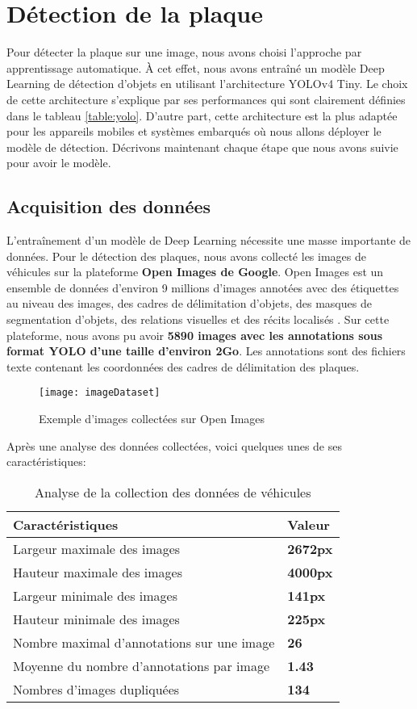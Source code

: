 \section{Détection de la plaque}
Pour détecter la plaque sur une image, nous avons choisi l’approche par apprentissage automatique. À cet effet, nous avons entraîné un modèle Deep Learning de détection d’objets en utilisant l’architecture YOLOv4 Tiny. Le choix de cette architecture s’explique par ses performances qui sont clairement définies dans le tableau \ref{table:yolo}. D’autre part, cette architecture est la plus adaptée pour les appareils mobiles et systèmes embarqués où nous allons déployer le modèle de détection. Décrivons maintenant chaque étape que nous avons suivie pour avoir le modèle.
    \subsection{Acquisition des données}
    L’entraînement d’un modèle de Deep Learning nécessite une masse importante de données. Pour le détection des plaques, nous avons collecté les images de véhicules sur la plateforme \textbf{Open Images de Google}. Open Images est un ensemble de données d'environ 9 millions d'images annotées avec des étiquettes au niveau des images, des cadres de délimitation d'objets, des masques de segmentation d'objets, des relations visuelles et des récits localisés \cite{oid6}. Sur cette plateforme, nous avons pu  avoir \textbf{5890 images avec les annotations sous format YOLO d’une taille d’environ 2Go}. Les annotations sont des fichiers texte contenant les coordonnées des cadres de délimitation des plaques. 
    \begin{figure}[H]
        \centering
        \texttt{[image: imageDataset]}
        \caption{Exemple d'images collectées sur Open Images}
    \end{figure}
    Après une analyse des données collectées, voici quelques unes de ses caractéristiques:
    \begin{table}[H]
        \centering
        \begin{tabular}{|l|l|}
            \hline
            \rowcolor{Gray}
            \textbf{Caractéristiques} & \textbf{Valeur} \\ \hline
            Largeur maximale des images & \textbf{2672px} \\ \hline
            Hauteur maximale des images & \textbf{4000px} \\ \hline
            Largeur minimale des images & \textbf{141px} \\ \hline
            Hauteur minimale des images & \textbf{225px} \\ \hline
            Nombre maximal d'annotations sur une image & \textbf{26} \\ \hline
            Moyenne du nombre d'annotations par image & \textbf{1.43} \\ \hline
            Nombres d'images dupliquées & \textbf{134} \\ \hline
        \end{tabular}
        \caption{Analyse de la collection des données de véhicules}
    \end{table}
